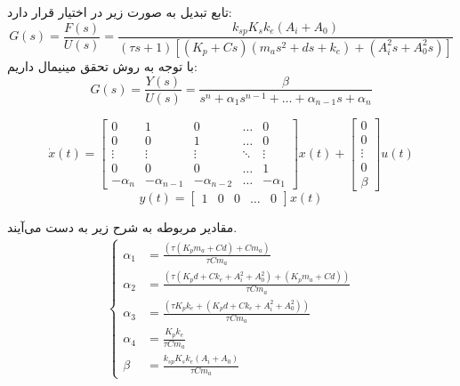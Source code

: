 \documentclass[14pt, a4paper]{extarticle}
\begin{document}
تابع تبدیل به صورت زیر در اختیار قرار دارد:\\
\[
G(s) = \frac{F(s)}{U(s)} = \frac{k_{sp} K_s k_e (A_i + A_0)}{(\tau s + 1) \left[ (K_p + Cs)(m_a s^2 + d s + k_e) + (A_i^2 s + A_0^2 s) \right]}
\]
با توجه به روش تحقق مینیمال داریم:
\[
G(s) = \frac{Y(s)}{U(s)} = \frac{\beta}{s^n + \alpha_1 s^{n-1} + \dots + \alpha_{n-1}s + \alpha_n}
\]

\[
\dot{x}(t) = 
\begin{bmatrix}
	0 & 1 & 0 & \dots & 0 \\
	0 & 0 & 1 & \dots & 0 \\
	\vdots & \vdots & \vdots & \ddots & \vdots \\
	0 & 0 & 0 & \dots & 1 \\
	-\alpha_n & -\alpha_{n-1} & -\alpha_{n-2} & \dots & -\alpha_1
\end{bmatrix}
x(t)
+
\begin{bmatrix}
	0 \\
	0 \\
	\vdots \\
	0 \\
	\beta
\end{bmatrix}
u(t)
\]
\[
y(t) = 
\begin{bmatrix}
	1 & 0 & 0 & \dots & 0
\end{bmatrix}
x(t)
\]

مقادیر مربوطه به شرح زیر به دست می‌آیند.
\[
\begin{aligned}
	\left\{
	\begin{aligned}
		\alpha_1 &= \frac{\left( \tau (K_p m_a + C d) + C m_a \right)}{\tau C m_a} \\
		\alpha_2 &= \frac{\left( \tau (K_p d + C k_e + A_i^2 + A_0^2) + (K_p m_a + C d) \right)}{\tau C m_a} \\
		\alpha_3 &= \frac{\left( \tau K_p k_e + (K_p d + C k_e + A_i^2 + A_0^2) \right)}{\tau C m_a} \\
		\alpha_4 &= \frac{K_p k_e}{\tau C m_a} \\
		\beta &= \frac{k_{sp} K_s k_e (A_i + A_0)}{\tau C m_a}
	\end{aligned} \right. 
\end{aligned}
\]

\end{document}
